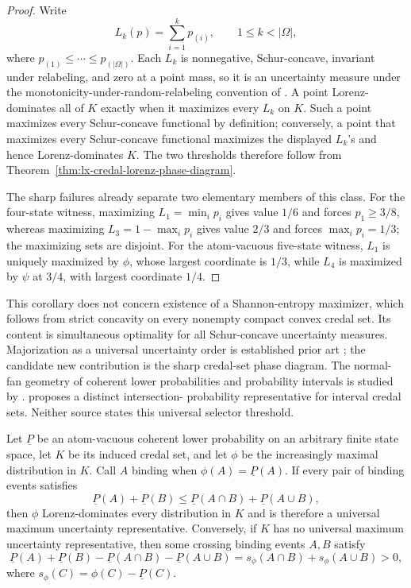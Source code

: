 \begin{proof}
Write
\[
 L_k(p)=\sum_{i=1}^k p_{(i)},\qquad 1\leq k<|\Omega|,
\]
where $p_{(1)}\leq\cdots\leq p_{(|\Omega|)}$.  Each $L_k$ is nonnegative,
Schur-concave, invariant under relabeling, and zero at a point mass, so it is
an uncertainty measure under the monotonicity-under-random-relabeling
convention of \citet{FriedlandGheorghiuGour2013}.  A point Lorenz-dominates
all of $K$ exactly when it maximizes every $L_k$ on $K$.  Such a point
maximizes every Schur-concave functional by definition; conversely, a point
that maximizes every Schur-concave functional maximizes the displayed
$L_k$'s and hence Lorenz-dominates $K$.  The two thresholds therefore follow
from Theorem~\ref{thm:lx-credal-lorenz-phase-diagram}.

The sharp failures already separate two elementary members of this class.
For the four-state witness, maximizing $L_1=\min_i p_i$ gives value $1/6$
and forces $p_1\geq3/8$, whereas maximizing
$L_3=1-\max_i p_i$ gives value $2/3$ and forces
$\max_i p_i=1/3$; the maximizing sets are disjoint.  For the atom-vacuous
five-state witness, $L_1$ is uniquely maximized by $\phi$, whose largest
coordinate is $1/3$, while $L_4$ is maximized by $\psi$ at $3/4$, with
largest coordinate $1/4$.
\end{proof}

This corollary does not concern existence of a Shannon-entropy maximizer,
which follows from strict concavity on every nonempty compact convex credal
set.  Its content is simultaneous optimality for all Schur-concave
uncertainty measures.  Majorization as a universal uncertainty order is
established prior art \citep{FriedlandGheorghiuGour2013}; the candidate new
contribution is the sharp credal-set phase diagram.  The normal-fan geometry
of coherent lower probabilities and probability intervals is studied by
\citet{Skulj2022}.  \citet{Cuzzolin2022} proposes a distinct intersection-
probability representative for interval credal sets.  Neither source states
this universal selector threshold.

\begin{theorem}
\label{thm:lx-credal-binding-event-selector}
Let $\underline P$ be an atom-vacuous coherent lower probability on an
arbitrary finite state space, let $K$ be its induced credal set, and let
$\phi$ be the increasingly maximal distribution in $K$.  Call $A$ binding
when $\phi(A)=\underline P(A)$.  If every pair of binding events satisfies
\[
 \underline P(A)+\underline P(B)
 \leq \underline P(A\cap B)+\underline P(A\cup B),       \tag{BES}
 \label{eq:lx-binding-event-supermodularity}
\]
then $\phi$ Lorenz-dominates every distribution in $K$ and is therefore a
universal maximum uncertainty representative.  Conversely, if $K$ has no
universal maximum uncertainty representative, then some crossing binding
events $A,B$ satisfy
\[
 \underline P(A)+\underline P(B)
 -\underline P(A\cap B)-\underline P(A\cup B)
 =s_\phi(A\cap B)+s_\phi(A\cup B)>0,                     \tag{BD}
 \label{eq:lx-credal-broken-diamond}
\]
where $s_\phi(C)=\phi(C)-\underline P(C)$.
\end{theorem}

